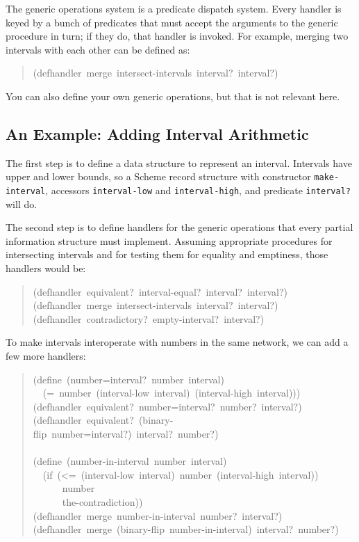 \documentclass[12pt,letterpaper,english]{article}
\begin{document}
The generic operations system is a predicate dispatch system.  Every
handler is keyed by a bunch of predicates that must accept the
arguments to the generic procedure in turn; if they do, that handler
is invoked.  For example, merging two intervals with each other
can be defined as:
\begin{quote}{\ttfamily \raggedright \noindent
(defhandler~merge~intersect-intervals~interval?~interval?)
}\end{quote}

You can also define your own generic operations, but that is not
relevant here.



\subsection{An Example: Adding Interval Arithmetic}
\label{an-example-adding-interval-arithmetic}

The first step is to define a data structure to represent an interval.
Intervals have upper and lower bounds, so a Scheme record structure
with constructor \texttt{make-interval}, accessors \texttt{interval-low} and
\texttt{interval-high}, and predicate \texttt{interval?} will do.

The second step is to define handlers for the generic operations that
every partial information structure must implement.  Assuming
appropriate procedures for intersecting intervals and for testing them
for equality and emptiness, those handlers would be:
\begin{quote}{\ttfamily \raggedright \noindent
(defhandler~equivalent?~interval-equal?~interval?~interval?)~\\
(defhandler~merge~intersect-intervals~interval?~interval?)~\\
(defhandler~contradictory?~empty-interval?~interval?)
}\end{quote}

To make intervals interoperate with numbers in the same network,
we can add a few more handlers:
\begin{quote}{\ttfamily \raggedright \noindent
(define~(number=interval?~number~interval)~\\
~~(=~number~(interval-low~interval)~(interval-high~interval)))~\\
(defhandler~equivalent?~number=interval?~number?~interval?)~\\
(defhandler~equivalent?~(binary-flip~number=interval?)~interval?~number?)~\\
~\\
(define~(number-in-interval~number~interval)~\\
~~(if~(<=~(interval-low~interval)~number~(interval-high~interval))~\\
~~~~~~number~\\
~~~~~~the-contradiction))~\\
(defhandler~merge~number-in-interval~number?~interval?)~\\
(defhandler~merge~(binary-flip~number-in-interval)~interval?~number?)
}\end{quote}
\end{document}
